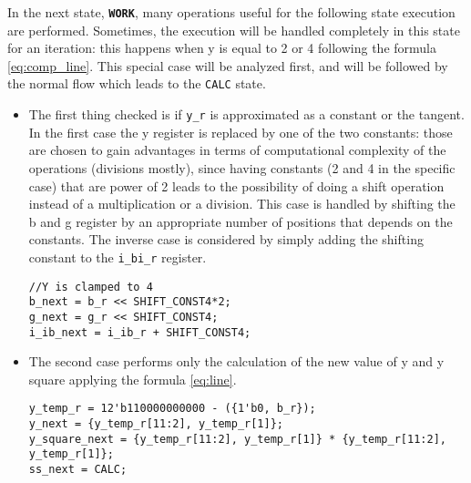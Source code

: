 \documentclass[paper=letter, fontsize=12pt]{article}
\begin{document}
In the next state, \textbf\texttt{WORK}, many operations useful for the following state execution are performed. Sometimes, the execution will be handled completely in this state for an iteration: this happens when y is equal to 2 or 4 following the formula \ref{eq:comp_line}. This special case will be analyzed first, and will be followed by the normal flow which leads to the \texttt{CALC} state.
\begin{itemize}
    \item The first thing checked is if \texttt{y\_r} is approximated as a constant or the tangent. In the first case the y register is replaced by one of the two constants: those are chosen to gain advantages in terms of computational complexity of the operations (divisions mostly), since having constants (2 and 4 in the specific case) that are power of 2 leads to the possibility of doing a shift operation instead of a multiplication or a division. This case is handled by shifting the b and g register by an appropriate number of positions that depends on the constants. The inverse case is considered by simply adding the shifting constant to the \texttt{i\_bi\_r} register.
\begin{lstlisting}
//Y is clamped to 4
b_next = b_r << SHIFT_CONST4*2;
g_next = g_r << SHIFT_CONST4;
i_ib_next = i_ib_r + SHIFT_CONST4;
\end{lstlisting}
    \item The second case performs only the calculation of the new value of y and y square applying the formula \ref{eq:line}.
\begin{lstlisting}
y_temp_r = 12'b110000000000 - ({1'b0, b_r});
y_next = {y_temp_r[11:2], y_temp_r[1]};
y_square_next = {y_temp_r[11:2], y_temp_r[1]} * {y_temp_r[11:2], y_temp_r[1]};
ss_next = CALC;
\end{lstlisting}
    \end{itemize}
    
\end{document}
